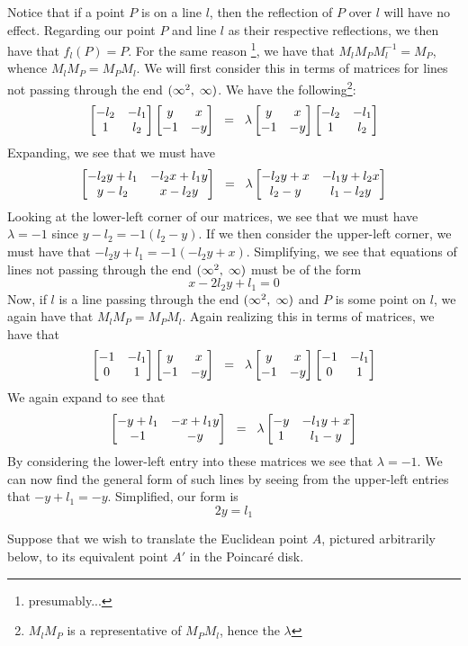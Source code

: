 \documentclass[12pt]{article}
\newcommand{\poincare}{Poincar\'{e} }
\newcommand{\inv}{^{-1}}
\newcommand{\spceq}{\hspace{2mm} = \hspace{2mm}}
\newcommand{\ttc}{, \hspace{1mm}}
\newcommand{\lftmat}[4]{\begin{bmatrix} {#1} & {#2} \\ {#3} & {#4} \end{bmatrix}}
\newcommand{\pointmat}[2]{\lftmat{{#2}}{{#1}}{-1}{-{#2}}}
\newcommand{\stanpointmat}{\pointmat{x}{y}}
\newcommand{\linenoendmat}[2]{\begin{bmatrix} -{#2} & -{#1} \\ 1 & {#2} \end{bmatrix}}
\newcommand{\stanlinenoendmat}{\linenoendmat{l_1}{l_2}}
\newcommand{\lineendmat}[2]{\begin{bmatrix} -1 & -{#1} \\ 0 & 1 \end{bmatrix}}
\newcommand{\stanlineendmat}{\lineendmat{l_1}{l_2}}
\newcommand{\specialend}{(\infty^2\ttc\infty)}
\begin{document}
Notice that if a point $P$ is on a line $l$, then the reflection of $P$ over $l$ will have no effect. Regarding our point $P$ and line $l$ as their respective reflections, we then have that $f_l(P) = P$. For the same reason \footnote{presumably...}, we have that $M_l M_P M_l\inv = M_P$, whence $M_l M_P = M_P M_l$. We will first consider this in terms of matrices for lines not passing through the end $\specialend$. We have the following\footnote{$M_l M_P$ is a representative of $M_P M_l$, hence the $\lambda$}:
\begin{equation} 
\stanlinenoendmat\stanpointmat \spceq \lambda \stanpointmat\stanlinenoendmat
\end{equation}	
Expanding, we see that we must have
	\[
		\lftmat{-l_2y+l_1}{-l_2x+l_1y}{y-l_2}{x-l_2y} \spceq \lambda \lftmat{-l_2y+x}{-l_1y+l_2x}{l_2-y}{l_1-l_2y}
	\]
Looking at the lower-left corner of our matrices, we see that we must have $\lambda = -1$ since $y - l_2 = -1(l_2 - y)$. If we then consider the upper-left corner, we must have that $-l_2y + l_1 = -1(-l_2y + x)$. Simplifying, we see that equations of lines not passing through the end $\specialend$ must be of the form
\begin{equation}
	x - 2l_2y + l_1  = 0
\end{equation} 
Now, if $l$ is a line passing through the end $\specialend$ and $P$ is some point on $l$, we again have that $M_l M_P = M_P M_l$. Again realizing this in terms of matrices, we have that 
\begin{equation} 
	\stanlineendmat\stanpointmat \spceq \lambda \stanpointmat\stanlineendmat
\end{equation}	
We again expand to see that 
	\[
		\lftmat{-y+l_1}{-x+l_1y}{-1}{-y} \spceq \lambda \lftmat{-y}{-l_1y+x}{1}{l_1-y}
	\]
By considering the lower-left entry into these matrices we see that $\lambda = -1$. We can now find the general form of such lines by seeing from the upper-left entries that $-y+l_1 = -y$. Simplified, our form is 
\begin{equation}
	2y = l_1
\end{equation} 



\newpage

\noindent Suppose that we wish to translate the Euclidean point $A$, pictured arbitrarily below, to its equivalent point $A'$ in the \poincare disk.
\end{document}
